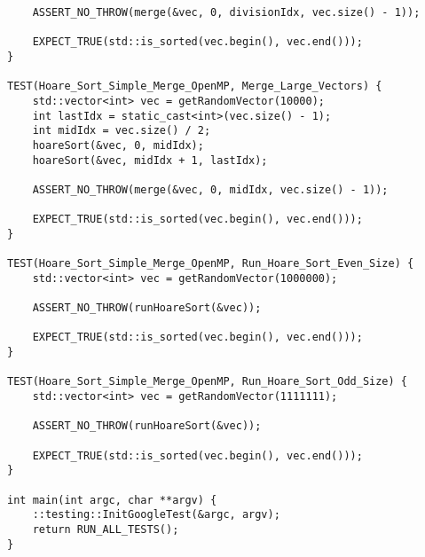 \documentclass{report}
\begin{document}
\begin{lstlisting}
    ASSERT_NO_THROW(merge(&vec, 0, divisionIdx, vec.size() - 1));

    EXPECT_TRUE(std::is_sorted(vec.begin(), vec.end()));
}

TEST(Hoare_Sort_Simple_Merge_OpenMP, Merge_Large_Vectors) {
    std::vector<int> vec = getRandomVector(10000);
    int lastIdx = static_cast<int>(vec.size() - 1);
    int midIdx = vec.size() / 2;
    hoareSort(&vec, 0, midIdx);
    hoareSort(&vec, midIdx + 1, lastIdx);

    ASSERT_NO_THROW(merge(&vec, 0, midIdx, vec.size() - 1));

    EXPECT_TRUE(std::is_sorted(vec.begin(), vec.end()));
}

TEST(Hoare_Sort_Simple_Merge_OpenMP, Run_Hoare_Sort_Even_Size) {
    std::vector<int> vec = getRandomVector(1000000);

    ASSERT_NO_THROW(runHoareSort(&vec));

    EXPECT_TRUE(std::is_sorted(vec.begin(), vec.end()));
}

TEST(Hoare_Sort_Simple_Merge_OpenMP, Run_Hoare_Sort_Odd_Size) {
    std::vector<int> vec = getRandomVector(1111111);

    ASSERT_NO_THROW(runHoareSort(&vec));

    EXPECT_TRUE(std::is_sorted(vec.begin(), vec.end()));
}

int main(int argc, char **argv) {
    ::testing::InitGoogleTest(&argc, argv);
    return RUN_ALL_TESTS();
}

\end{lstlisting}
\end{document}
